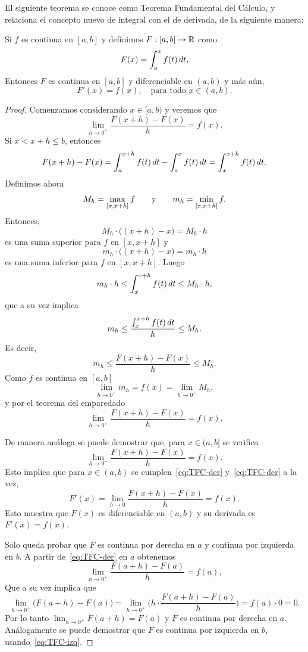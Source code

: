 El siguiente teorema se conoce como Teorema Fundamental del Cálculo, y relaciona el concepto nuevo de integral con el de derivada, de la siguiente manera:

\begin{theorem}\label{T:TFC}
  Si $f$ es continua en $[a,b]$ y definimos $F:[a,b]\to\mathbb{R}$ como 
  \[
  F(x)=\int_a^x f(t)\,dt,
  \]
  Entonces $F$ es continua en $[a,b]$ y diferenciable en $(a,b)$ y más aún, 
  \[
  F'(x)=f(x),\quad\text{para todo $x\in(a,b)$.}
  \]
\end{theorem}

\begin{proof}
  Comenzamos considerando $x\in[a,b)$ y veremos que 
  \[\lim_{h\to 0^+}\frac{F(x+h)-F(x)}{h}=f(x).\]
  Si $x<x+h\le b$, entonces
  \[F(x+h)-F(x)=\int_a^{x+h}f(t)\,dt - \int_a^x f(t)\,dt = \int_x^{x+h}f(t)\,dt.\]
  Definimos ahora 
  $$ M_h = \max_{[x,x+h]}f\qquad\text y\qquad
  m_h = \min_{[x,x+h]}f.$$
  Entonces, 
  $$ M_h \cdot \big( (x+h)-x \big) = M_h \cdot h $$
  es una suma superior para $f$ en $[x,x+h]$ y
  $$ m_h \cdot \big( (x+h)-x \big) = m_h \cdot h $$ 
  es una suma inferior para $f$ en $[x,x+h]$.
  Luego
  $$ m_h \cdot h \le \int_x^{x+h}f(t)\,dt \le M_h\cdot h,$$
  que a su vez implica
  $$ m_h \le \frac{\int_x^{x+h}f(t)\,dt}h \le M_h.$$
  Es decir,
  $$ m_h \le \frac{F(x+h)-F(x)}h \le M_h.$$
  Como $f$ es continua en $[a,b]$
  \[
  \lim_{h\to0^+} m_h = f(x) = \lim_{h\to 0^+} M_h,
  \]
  y por el teorema del emparedado
  \begin{equation}\label{eq:TFC-der}
    \lim_{h\to 0^+} \frac{F(x+h)-F(x)}h = f(x).
  \end{equation}

  De manera análoga se puede demostrar que, para $x\in(a,b]$ se verifica
  \begin{equation}\label{eq:TFC-izq}
    \lim_{h\to 0^-} \frac{F(x+h)-F(x)}h = f(x).
  \end{equation}
  Esto implica que para $x\in(a,b)$ se cumplen~\eqref{eq:TFC-der} y~\eqref{eq:TFC-der} a la vez, 
  \[
  F'(x)= \lim_{h\to 0} \frac{F(x+h)-F(x)}h = f(x).
  \]
  Esto muestra que $F(x)$ es diferenciable en $(a,b)$ y su derivada es $F'(x)=f(x)$.

  Solo queda probar que $F$ es continua por derecha en $a$ y continua por izquierda en $b$.
  A partir de~\eqref{eq:TFC-der} en $a$ obtenemos
  $$ 
  \lim_{h\to 0^+} \frac{F(a+h)-F(a)}h = f(a),
  $$ 
  Que a su vez implica que
  $$ 
  \lim_{h\to 0^+} \big(F(a+h)-F(a)\big)
  = \lim_{h\to 0^+}\Big( h\cdot \frac{F(a+h)-F(a)}h \Big)= f(a)\cdot 0 = 0.
  $$ 
  Por lo tanto $\lim_{h\to 0^+} F(a+h)=F(a)$ y $F$ es continua por derecha en $a$.
  Análogamente se puede demostrar que $F$ es continua por izquierda en $b$, usando~\eqref{eq:TFC-izq}.
\end{proof}

